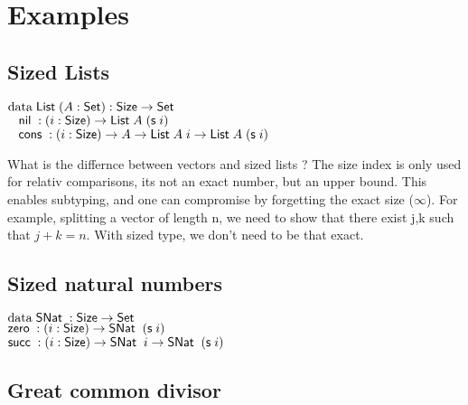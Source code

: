\section{Examples}
\subsection{Sized Lists}
\begin{bsp}
$\mathrm{data}\; \mathsf{List}\; ( A : \mathsf{Set} ) : \mathsf{Size} \rightarrow \mathsf{Set} $ \\
$\hspace*{3mm} \mathsf{nil}\; : ( i : \mathsf{Size} ) \rightarrow{ \mathsf{List}\;A \; (\mathsf{s}\;i)} $\\
$\hspace*{3mm} \mathsf{cons}\; : ( i : \mathsf{Size} ) \rightarrow{ A \rightarrow\mathsf{List}\;A \; i \rightarrow\mathsf{List}\;A \; (\mathsf{s}\;i)} $
\end{bsp}

What is the differnce between vectors and sized lists ?
The size index is only used for relativ comparisons, its not an exact number, but an upper bound.
This enables subtyping, and one can compromise by forgetting the exact size ($\infty$).
For example, splitting a vector of length n, we need to show that there exist j,k such that $j+k = n$.
With sized type, we don't need to be that exact.
\subsection{Sized natural numbers}
\begin{bsp}
$\mathrm{data}\; \mathsf{SNat}\; : \mathsf{Size} \rightarrow \mathsf{Set} $ \\
$\mathsf{zero}\; : ( i : \mathsf{Size} ) \rightarrow{ \mathsf{SNat}\;\; (\mathsf{s}\;i)} $\\
$\mathsf{succ}\; : ( i : \mathsf{Size} ) \rightarrow{ \mathsf{SNat}\;\; i \rightarrow\mathsf{SNat}\;\; (\mathsf{s}\;i)} $
\end{bsp}

\subsection{Great common divisor}

